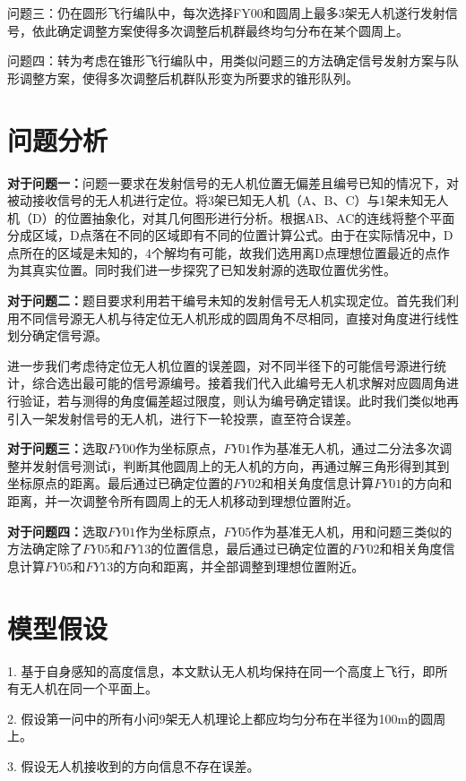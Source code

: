 \documentclass{ctexart}
\begin{document}
问题三：仍在圆形飞行编队中，每次选择FY00和圆周上最多3架无人机遂行发射信号，依此确定调整方案使得多次调整后机群最终均匀分布在某个圆周上。

问题四：转为考虑在锥形飞行编队中，用类似问题三的方法确定信号发射方案与队形调整方案，使得多次调整后机群队形变为所要求的锥形队列。

\section{问题分析}
\textbf{对于问题一：}问题一要求在发射信号的无人机位置无偏差且编号已知的情况下，对被动接收信号的无人机进行定位。将3架已知无人机（A、B、C）与1架未知无人机（D）的位置抽象化，对其几何图形进行分析。根据AB、AC的连线将整个平面分成区域，D点落在不同的区域即有不同的位置计算公式。由于在实际情况中，D点所在的区域是未知的，4个解均有可能，故我们选用离D点理想位置最近的点作为其真实位置。同时我们进一步探究了已知发射源的选取位置优劣性。

\textbf{对于问题二：}题目要求利用若干编号未知的发射信号无人机实现定位。首先我们利用不同信号源无人机与待定位无人机形成的圆周角不尽相同，直接对角度进行线性划分确定信号源。

进一步我们考虑待定位无人机位置的误差圆，对不同半径下的可能信号源进行统计，综合选出最可能的信号源编号。接着我们代入此编号无人机求解对应圆周角进行验证，若与测得的角度偏差超过限度，则认为编号确定错误。此时我们类似地再引入一架发射信号的无人机，进行下一轮投票，直至符合误差。

\textbf{对于问题三：}选取$FY00$作为坐标原点，$FY01$作为基准无人机，通过二分法多次调整并发射信号测试ℹ，判断其他圆周上的无人机的方向，再通过解三角形得到其到坐标原点的距离。最后通过已确定位置的$FY02$和相关角度信息计算$FY01$的方向和距离，并一次调整令所有圆周上的无人机移动到理想位置附近。
    
\textbf{对于问题四：}选取$FY01$作为坐标原点，$FY05$作为基准无人机，用和问题三类似的方法确定除了$FY05$和$FY13$的位置信息，最后通过已确定位置的$FY02$和相关角度信息计算$FY05$和$FY13$的方向和距离，并全部调整到理想位置附近。


\section{模型假设}
1. \quad 基于自身感知的高度信息，本文默认无人机均保持在同一个高度上飞行，即所有无人机在同一个平面上。

2. \quad 假设第一问中的所有小问9架无人机理论上都应均匀分布在半径为100m的圆周上。

3. \quad 假设无人机接收到的方向信息不存在误差。
\end{document}
